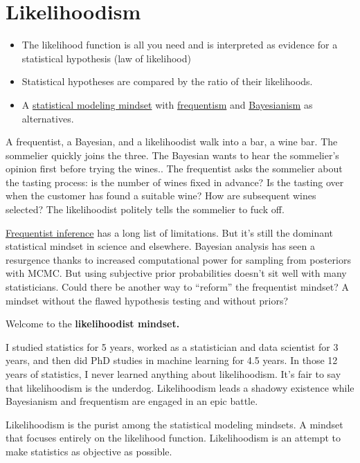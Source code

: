 \documentclass[
  10pt,
]{scrbook}
\providecommand{\tightlist}{%
  \setlength{\itemsep}{0pt}\setlength{\parskip}{0pt}}
\begin{document}
\hypertarget{likelihoodism}{%
\chapter{Likelihoodism}\label{likelihoodism}}

\begin{itemize}
\tightlist
\item
  The likelihood function is all you need and is interpreted as evidence for a statistical hypothesis (law of likelihood)
\item
  Statistical hypotheses are compared by the ratio of their likelihoods.
\item
  A \protect\hyperlink{statistical-modeling}{statistical modeling mindset} with \protect\hyperlink{frequent-inference}{frequentism} and \protect\hyperlink{bayesian-inference}{Bayesianism} as alternatives.
\end{itemize}

A frequentist, a Bayesian, and a likelihoodist walk into a bar, a wine bar.
The sommelier quickly joins the three.
The Bayesian wants to hear the sommelier's opinion first before trying the wines..
The frequentist asks the sommelier about the tasting process: is the number of wines fixed in advance? Is the tasting over when the customer has found a suitable wine? How are subsequent wines selected?
The likelihoodist politely tells the sommelier to fuck off.

\protect\hyperlink{frequentist-inference}{Frequentist inference} has a long list of limitations.
But it's still the dominant statistical mindset in science and elsewhere.
Bayesian analysis has seen a resurgence thanks to increased computational power for sampling from posteriors with MCMC.
But using subjective prior probabilities doesn't sit well with many statisticians.
Could there be another way to ``reform'' the frequentist mindset?
A mindset without the flawed hypothesis testing and without priors?

Welcome to the \textbf{likelihoodist mindset.}

I studied statistics for 5 years, worked as a statistician and data scientist for 3 years, and then did PhD studies in machine learning for 4.5 years.
In those 12 years of statistics, I never learned anything about likelihoodism.
It's fair to say that likelihoodism is the underdog.
Likelihoodism leads a shadowy existence while Bayesianism and frequentism are engaged in an epic battle.

Likelihoodism is the purist among the statistical modeling mindsets.
A mindset that focuses entirely on the likelihood function.
Likelihoodism is an attempt to make statistics as objective as possible.
\end{document}
